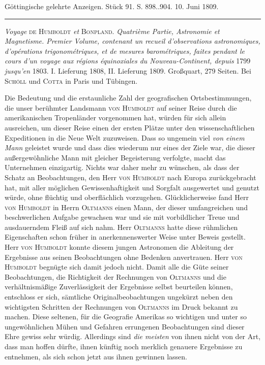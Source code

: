 \clearpage
{}
\hypertarget{native-517-lower}{}\label{native-517-lower}
\begin{center}\small Göttingische gelehrte Anzeigen. Stück 91. S. 898..904. 10. Juni 1809.\\[3pt]\rule{.72\linewidth}{.3pt}\end{center}

\emph{Voyage} \textsc{de Humboldt} \emph{et} \textsc{Bonpland}. \emph{Quatrième Partie, Astronomie et Magnetisme. Premier Volume, contenant un recueil d'observations astronomiques, d'opérations trigonométriques, et de mesures barométriques, faites pendant le cours d'un voyage aux régions équinoxiales du Nouveau-Continent, depuis} 1799 \emph{jusqu'en} 1803. I. Lieferung 1808, II. Lieferung 1809. Großquart, 279 Seiten. Bei \textsc{Schöll} und \textsc{Cotta} in Paris und Tübingen.

Die Bedeutung und die erstaunliche Zahl der geografischen Ortsbestimmungen, die unser berühmter Landsmann \textsc{von Humboldt} auf seiner Reise durch die amerikanischen Tropenländer vorgenommen hat, würden für sich allein ausreichen, um dieser Reise einen der ersten Plätze unter den wissenschaftlichen Expeditionen in die Neue Welt zuzuweisen. Dass so ungemein viel \emph{von einem Mann} geleistet wurde und dass dies wiederum nur eines der Ziele war, die dieser außergewöhnliche Mann mit gleicher Begeisterung verfolgte, macht das Unternehmen einzigartig. Nichts war daher mehr zu wünschen, als dass der Schatz an Beobachtungen, den Herr \textsc{von Humboldt} nach Europa zurückgebracht hat, mit aller möglichen Gewissenhaftigkeit und Sorgfalt ausgewertet und genutzt würde, ohne flüchtig und oberflächlich vorzugehen. Glücklicherweise fand Herr \textsc{von Humboldt} in Herrn \textsc{Oltmanns} einen Mann, der dieser umfangreichen und beschwerlichen Aufgabe gewachsen war und sie mit vorbildlicher Treue und ausdauerndem Fleiß auf sich nahm. Herr \textsc{Oltmanns} hatte diese rühmlichen Eigenschaften schon früher in anerkennenswerter Weise unter Beweis gestellt. Herr \textsc{von Humboldt} konnte diesem jungen Astronomen die Ableitung der Ergebnisse aus seinen Beobachtungen ohne Bedenken anvertrauen. Herr \textsc{von Humboldt} begnügte sich damit jedoch nicht. Damit alle die Güte seiner Beobachtungen, die Richtigkeit der Rechnungen von \textsc{Oltmanns} und die verhältnismäßige Zuverlässigkeit der Ergebnisse selbst beurteilen können, entschloss er sich, sämtliche Originalbeobachtungen ungekürzt neben den wichtigsten Schritten der Rechnungen von \textsc{Oltmanns} im Druck bekannt zu machen. Diese seltenen, für die Geografie Amerikas so wichtigen und unter so ungewöhnlichen Mühen und Gefahren errungenen Beobachtungen sind dieser Ehre gewiss sehr würdig. Allerdings sind \emph{die meisten} von ihnen nicht von der Art, dass man hoffen dürfte, ihnen künftig noch merklich genauere Ergebnisse zu entnehmen, als sich schon jetzt aus ihnen gewinnen lassen.

